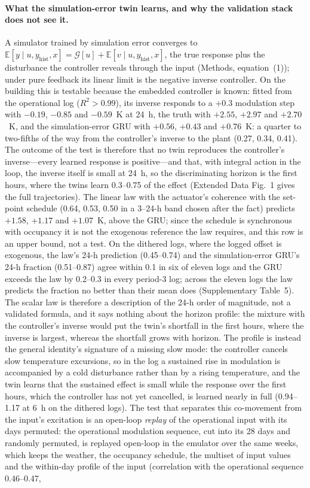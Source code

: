 \documentclass[11pt]{article}
\newcommand{\E}{\mathbb{E}}
\begin{document}
\paragraph{What the simulation-error twin learns, and why the validation stack does not see it.} A simulator trained by simulation error converges to $\E[y\mid u,y_{\mathrm{hist}},x]=\mathcal G[u]+\E[v\mid u,y_{\mathrm{hist}},x]$, the true response plus the disturbance the controller reveals through the input (Methods, equation~(1)); under pure feedback its linear limit is the negative inverse controller. On the building this is testable because the embedded controller is known: fitted from the operational log ($R^2>0.99$), its inverse responds to a $+0.3$ modulation step with $-0.19$, $-0.85$ and $-0.59$~K at 24~h, the truth with $+2.55$, $+2.97$ and $+2.70$~K, and the simulation-error GRU with $+0.56$, $+0.43$ and $+0.76$~K: a quarter to two-fifths of the way from the controller's inverse to the plant (0.27, 0.34, 0.41). The outcome of the test is therefore that no twin reproduces the controller's inverse---every learned response is positive---and that, with integral action in the loop, the inverse itself is small at 24~h, so the discriminating horizon is the first hours, where the twins learn 0.3--0.75 of the effect (Extended Data Fig.~1 gives the full trajectories). The linear law with the actuator's coherence with the set-point schedule (0.64, 0.53, 0.50 in a 3--24-h band chosen after the fact) predicts $+1.58$, $+1.17$ and $+1.07$~K, above the GRU; since the schedule is synchronous with occupancy it is not the exogenous reference the law requires, and this row is an upper bound, not a test. On the dithered logs, where the logged offset is exogenous, the law's 24-h prediction (0.45--0.74) and the simulation-error GRU's 24-h fraction (0.51--0.87) agree within 0.1 in six of eleven logs and the GRU exceeds the law by 0.2--0.3 in every period-3 log; across the eleven logs the law predicts the fraction no better than their mean does (Supplementary Table~5). The scalar law is therefore a description of the 24-h order of magnitude, not a validated formula, and it says nothing about the horizon profile: the mixture with the controller's inverse would put the twin's shortfall in the first hours, where the inverse is largest, whereas the shortfall grows with horizon. The profile is instead the general identity's signature of a missing slow mode: the controller cancels slow temperature excursions, so in the log a sustained rise in modulation is accompanied by a cold disturbance rather than by a rising temperature, and the twin learns that the sustained effect is small while the response over the first hours, which the controller has not yet cancelled, is learned nearly in full (0.94--1.17 at 6~h on the dithered logs). The test that separates this co-movement from the input's excitation is an open-loop \emph{replay} of the operational input with its days permuted: the operational modulation sequence, cut into its 28 days and randomly permuted, is replayed open-loop in the emulator over the same weeks, which keeps the weather, the occupancy schedule, the multiset of input values and the within-day profile of the input (correlation with the operational sequence 0.46--0.47, 
\end{document}
